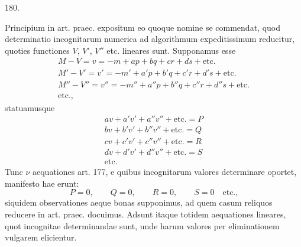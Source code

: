 \begin{center}\hypertarget{native-252-article180}{}180.\end{center}
Principium in art. praec. expositum eo quoque nomine se commendat, quod
determinatio incognitarum numerica ad algorithmum expeditissimum reducitur,
quoties functiones $V$, $V'$, $V''$ etc. lineares sunt. Supponamus esse
\[
\begin{gathered}
M-V=v=-m+ap+bq+cr+ds+\text{etc.}\\
M'-V'=v'=-m'+a'p+b'q+c'r+d's+\text{etc.}\\
M''-V''=v''=-m''+a''p+b''q+c''r+d''s+\text{etc.}\\
\text{etc.,}
\end{gathered}
\]
statuamusque
\[
\begin{gathered}
av+a'v'+a''v''+\text{etc.}=P\\
bv+b'v'+b''v''+\text{etc.}=Q\\
cv+c'v'+c''v''+\text{etc.}=R\\
dv+d'v'+d''v''+\text{etc.}=S\\
\text{etc.}
\end{gathered}
\]
Tunc $\nu$ aequationes art. 177, e quibus incognitarum valores determinare
oportet, manifesto hae erunt:
\[
P=0,\qquad Q=0,\qquad R=0,\qquad S=0\quad\text{etc.,}
\]
siquidem observationes aeque bonas supponimus, ad quem casum reliquos reducere
in art. praec. docuimus. Adsunt itaque totidem aequationes lineares, quot
incognitae determinandae sunt, unde harum valores per eliminationem vulgarem
elicientur.

